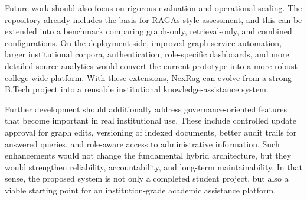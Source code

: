 Future work should also focus on rigorous evaluation and operational scaling. The repository already includes the basis for RAGAs-style assessment, and this can be extended into a benchmark comparing graph-only, retrieval-only, and combined configurations. On the deployment side, improved graph-service automation, larger institutional corpora, authentication, role-specific dashboards, and more detailed source analytics would convert the current prototype into a more robust college-wide platform. With these extensions, NexRag can evolve from a strong B.Tech project into a reusable institutional knowledge-assistance system.

Further development should additionally address governance-oriented features that become important in real institutional use. These include controlled update approval for graph edits, versioning of indexed documents, better audit trails for answered queries, and role-aware access to administrative information. Such enhancements would not change the fundamental hybrid architecture, but they would strengthen reliability, accountability, and long-term maintainability. In that sense, the proposed system is not only a completed student project, but also a viable starting point for an institution-grade academic assistance platform.
